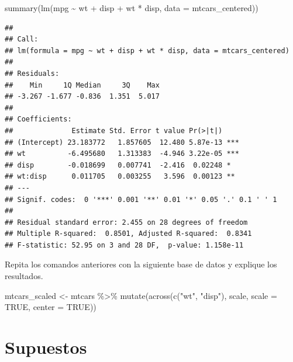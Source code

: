 \documentclass[
  12pt,
]{book}
\newenvironment{Shaded}{\begin{snugshade}}{\end{snugshade}}
\newcommand{\AttributeTok}[1]{\textcolor[rgb]{0.77,0.63,0.00}{#1}}
\newcommand{\ConstantTok}[1]{\textcolor[rgb]{0.00,0.00,0.00}{#1}}
\newcommand{\FunctionTok}[1]{\textcolor[rgb]{0.00,0.00,0.00}{#1}}
\newcommand{\NormalTok}[1]{#1}
\newcommand{\OtherTok}[1]{\textcolor[rgb]{0.56,0.35,0.01}{#1}}
\newcommand{\SpecialCharTok}[1]{\textcolor[rgb]{0.00,0.00,0.00}{#1}}
\newcommand{\StringTok}[1]{\textcolor[rgb]{0.31,0.60,0.02}{#1}}
\begin{document}
\begin{Shaded}
\begin{Highlighting}[]
\FunctionTok{summary}\NormalTok{(}\FunctionTok{lm}\NormalTok{(mpg }\SpecialCharTok{\textasciitilde{}}\NormalTok{ wt }\SpecialCharTok{+}\NormalTok{ disp }\SpecialCharTok{+}\NormalTok{ wt }\SpecialCharTok{*}\NormalTok{ disp, }\AttributeTok{data =}\NormalTok{ mtcars\_centered))}
\end{Highlighting}
\end{Shaded}

\begin{verbatim}
## 
## Call:
## lm(formula = mpg ~ wt + disp + wt * disp, data = mtcars_centered)
## 
## Residuals:
##    Min     1Q Median     3Q    Max 
## -3.267 -1.677 -0.836  1.351  5.017 
## 
## Coefficients:
##              Estimate Std. Error t value Pr(>|t|)    
## (Intercept) 23.183772   1.857605  12.480 5.87e-13 ***
## wt          -6.495680   1.313383  -4.946 3.22e-05 ***
## disp        -0.018699   0.007741  -2.416  0.02248 *  
## wt:disp      0.011705   0.003255   3.596  0.00123 ** 
## ---
## Signif. codes:  0 '***' 0.001 '**' 0.01 '*' 0.05 '.' 0.1 ' ' 1
## 
## Residual standard error: 2.455 on 28 degrees of freedom
## Multiple R-squared:  0.8501, Adjusted R-squared:  0.8341 
## F-statistic: 52.95 on 3 and 28 DF,  p-value: 1.158e-11
\end{verbatim}

\begin{exercise}

Repita los comandos anteriores con la siguiente base de datos y explique
los resultados.

\begin{Shaded}
\begin{Highlighting}[]
\NormalTok{mtcars\_scaled }\OtherTok{\textless{}{-}}\NormalTok{ mtcars }\SpecialCharTok{\%\textgreater{}\%}
    \FunctionTok{mutate}\NormalTok{(}\FunctionTok{across}\NormalTok{(}\FunctionTok{c}\NormalTok{(}\StringTok{"wt"}\NormalTok{, }\StringTok{"disp"}\NormalTok{), scale, }\AttributeTok{scale =} \ConstantTok{TRUE}\NormalTok{,}
        \AttributeTok{center =} \ConstantTok{TRUE}\NormalTok{))}
\end{Highlighting}
\end{Shaded}

\end{exercise}

\hypertarget{supuestos}{%
\section{Supuestos}\label{supuestos}}
\end{document}

